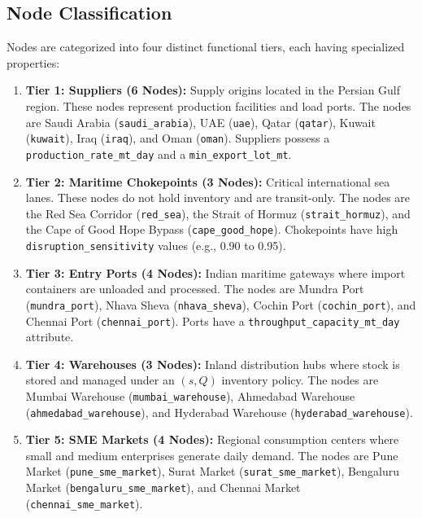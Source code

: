 \subsection{Node Classification}
Nodes are categorized into four distinct functional tiers, each having specialized properties:
\begin{enumerate}
    \item \textbf{Tier 1: Suppliers (6 Nodes):} Supply origins located in the Persian Gulf region. These nodes represent production facilities and load ports. The nodes are Saudi Arabia (\texttt{saudi\_arabia}), UAE (\texttt{uae}), Qatar (\texttt{qatar}), Kuwait (\texttt{kuwait}), Iraq (\texttt{iraq}), and Oman (\texttt{oman}). Suppliers possess a \texttt{production\_rate\_mt\_day} and a \texttt{min\_export\_lot\_mt}.
    \item \textbf{Tier 2: Maritime Chokepoints (3 Nodes):} Critical international sea lanes. These nodes do not hold inventory and are transit-only. The nodes are the Red Sea Corridor (\texttt{red\_sea}), the Strait of Hormuz (\texttt{strait\_hormuz}), and the Cape of Good Hope Bypass (\texttt{cape\_good\_hope}). Chokepoints have high \texttt{disruption\_sensitivity} values (e.g., 0.90 to 0.95).
    \item \textbf{Tier 3: Entry Ports (4 Nodes):} Indian maritime gateways where import containers are unloaded and processed. The nodes are Mundra Port (\texttt{mundra\_port}), Nhava Sheva (\texttt{nhava\_sheva}), Cochin Port (\texttt{cochin\_port}), and Chennai Port (\texttt{chennai\_port}). Ports have a \texttt{throughput\_capacity\_mt\_day} attribute.
    \item \textbf{Tier 4: Warehouses (3 Nodes):} Inland distribution hubs where stock is stored and managed under an $(s, Q)$ inventory policy. The nodes are Mumbai Warehouse (\texttt{mumbai\_warehouse}), Ahmedabad Warehouse (\texttt{ahmedabad\_warehouse}), and Hyderabad Warehouse (\texttt{hyderabad\_warehouse}).
    \item \textbf{Tier 5: SME Markets (4 Nodes):} Regional consumption centers where small and medium enterprises generate daily demand. The nodes are Pune Market (\texttt{pune\_sme\_market}), Surat Market (\texttt{surat\_sme\_market}), Bengaluru Market (\texttt{bengaluru\_sme\_market}), and Chennai Market (\texttt{chennai\_sme\_market}).
\end{enumerate}

